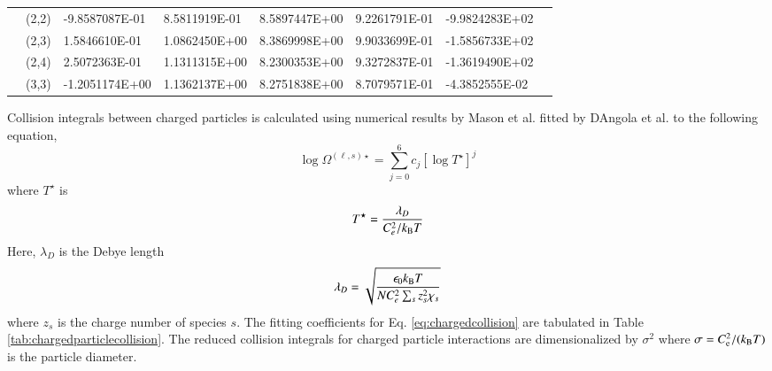 \documentclass{warpdoc}
\begin{document}
\begin{table}[h]
\begin{center}
\begin{threeparttable}
\begin{tabular*}{\textwidth}{@{\extracolsep{\fill}}llllllll}
&	(2,2)	&	-9.8587087E-01	&	8.5811919E-01	&	8.5897447E+00	&	9.2261791E-01	&	-9.9824283E+02	\\
&	(2,3)	&	1.5846610E-01	&	1.0862450E+00	&	8.3869998E+00	&	9.9033699E-01	&	-1.5856733E+02	\\
&	(2,4)	&	2.5072363E-01	&	1.1311315E+00	&	8.2300353E+00	&	9.3272837E-01	&	-1.3619490E+02	\\
&	(3,3)	&	-1.2051174E+00	&	1.1362137E+00	&	8.2751838E+00	&	8.7079571E-01	&	-4.3852555E-02	\\
      \bottomrule
    \end{tabular*}
    \label{tab:electronneutralfitting2}
  \end{threeparttable}
\end{center}
\end{table}
%

Collision integrals between charged particles is calculated using numerical results by Mason et al. \cite{pof:1967:mason,pof:1971:hahn} fitted by D{\textquotesingle}Angola et al. \cite{tepjd:2007:dAngola} to the following equation,
\begin{equation} \label{eq:chargedcollision}
  \log{\Omega^{(\ell, s) \star}}=\sum^6_{j=0}c_j\left[ \log{T^{\star}}\right]^j
\end{equation}
where $T^{\star}$ is
\begin{equation}
  T^{\star}=\frac{\lambda_D}{C_e^2/k_{\rm B} T}
\end{equation}
Here, $\lambda_D$ is the Debye length
\begin{equation}
  \lambda_D=\sqrt{\frac{\epsilon_0 k_{\rm B} T}{N C_e^2 \sum_s z_s^2 \chi_s}}
\end{equation}
where $z_s$ is the charge number of species $s$. The fitting coefficients for Eq. \ref{eq:chargedcollision} are tabulated in Table \ref{tab:chargedparticlecollision}. The reduced collision integrals for charged particle interactions are dimensionalized by $\sigma^2$ where $\sigma=C_{\rm e}^2/(k_{\rm B} T)$ is the particle diameter.
\end{document}
